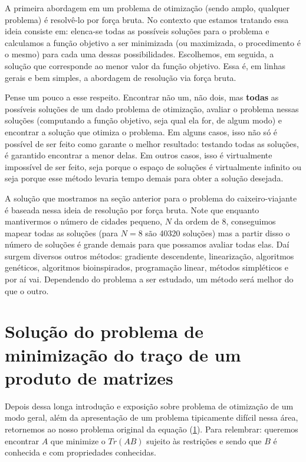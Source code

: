 \documentclass[11pt]{article}
\begin{document}
    A primeira abordagem em um problema de otimização (sendo amplo, qualquer
problema) é resolvê-lo por força bruta. No contexto que estamos tratando
essa ideia consiste em: elenca-se todas as possíveis soluções para o
problema e calculamos a função objetivo a ser minimizada (ou maximizada,
o procedimento é o mesmo) para cada uma dessas possibilidades.
Escolhemos, em seguida, a solução que corresponde ao menor valor da
função objetivo. Essa é, em linhas gerais e bem simples, a abordagem de
resolução via força bruta.

Pense um pouco a esse respeito. Encontrar não um, não dois, mas
\textbf{todas} as possíveis soluções de um dado problema de otimização,
avaliar o problema nessas soluções (computando a função objetivo, seja
qual ela for, de algum modo) e encontrar a solução que otimiza o
problema. Em alguns casos, isso não só é possível de ser feito como
garante o melhor resultado: testando todas as soluções, é garantido
encontrar a menor delas. Em outros casos, isso é virtualmente impossível
de ser feito, seja porque o espaço de soluções é virtualmente infinito
ou seja porque esse método levaria tempo demais para obter a solução
desejada.

A solução que mostramos na seção anterior para o problema do
caixeiro-viajante é baseada nessa ideia de resolução por força bruta.
Note que enquanto mantivermos o número de cidades pequeno, \(N\) da
ordem de 8, conseguimos mapear todas as soluções (para \(N = 8\) são
40320 soluções) mas a partir disso o número de soluções é grande demais
para que possamos avaliar todas elas. Daí surgem diversos outros
métodos: gradiente descendente, linearização, algoritmos genéticos,
algoritmos bioinspirados, programação linear, métodos simpléticos e por
aí vai. Dependendo do problema a ser estudado, um método será melhor do
que o outro.

    \hypertarget{soluuxe7uxe3o-do-problema-de-minimizauxe7uxe3o-do-trauxe7o-de-um-produto-de-matrizes}{%
\section{Solução do problema de minimização do traço de um produto
de
matrizes}\label{soluuxe7uxe3o-do-problema-de-minimizauxe7uxe3o-do-trauxe7o-de-um-produto-de-matrizes}}

    Depois dessa longa introdução e exposição sobre problema de otimização
de um modo geral, além da apresentação de um problema tipicamente
difícil nessa área, retornemos ao nosso problema original da equação
(\hyperref[mjx-eqn-eq1]{1}). Para relembrar: queremos encontrar \(A\)
que minimize o \(Tr(AB)\) sujeito às restrições e sendo que \(B\) é
conhecida e com propriedades conhecidas.
\end{document}
